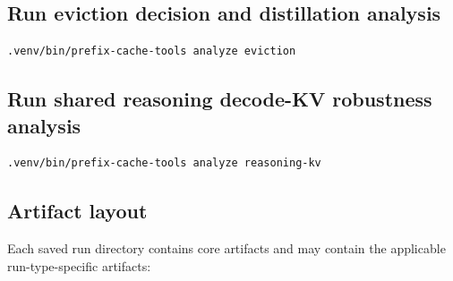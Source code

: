 \documentclass[11pt]{article}
\begin{document}
\subsection{Run eviction decision and distillation analysis}

\begin{lstlisting}[style=shell]
.venv/bin/prefix-cache-tools analyze eviction
\end{lstlisting}

\subsection{Run shared reasoning decode-KV robustness analysis}

\begin{lstlisting}[style=shell]
.venv/bin/prefix-cache-tools analyze reasoning-kv
\end{lstlisting}

\subsection{Artifact layout}

Each saved run directory contains core artifacts and may contain the applicable
run-type-specific artifacts:
\end{document}
